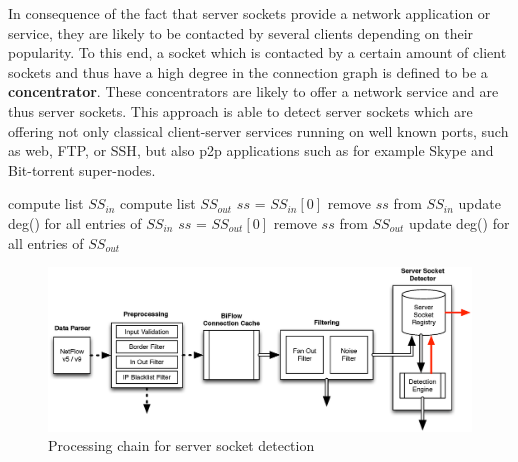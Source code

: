 In consequence of the fact that \glspl{server socket} provide a network 
application or service, they are likely to be contacted by several clients 
depending on their popularity. To this end, a socket which is contacted by a 
certain amount of client sockets and thus have a high degree in the connection 
graph is defined to be a \textbf{concentrator}. These concentrators are likely 
to offer a network service and are thus \glspl{server socket}. 
This approach is able to detect \glspl{server socket} which are offering not 
only classical client-server services running on well known ports, such as web, 
\gls{FTP}, or \gls{SSH}, but also \gls{p2p} applications such as for example 
Skype and Bit-torrent super-nodes.


\begin{algorithm}[t!]
\caption{Detection of server sockets by \citet{Schatzmann:Mining,Schatzmann:Dissection, Schatzmann:Tracing}}
\label{alg:service_tracing_ss-detection}
\begin{algorithmic}
\STATE
\STATE compute list $SS_{in}$ 
\STATE compute list $SS_{out}$ 
\STATE
{}
        \STATE $ss$ = $SS_{in}[0]$ 
        \STATE remove $ss$ from $SS_{in}$
        \STATE update deg() for all entries of $SS_{in}$
    \ENDWHILE
        \STATE $ss$ = $SS_{out}[0]$ 
        \STATE remove $ss$ from $SS_{out}$
        \STATE update deg() for all entries of $SS_{out}$
    \ENDWHILE
\ENDWHILE
\end{algorithmic}
\end{algorithm}

\begin{figure}
	[ht] \centering
	\includegraphics[width=\linewidth]{images/Detection_chain.eps}
	\caption{Processing chain for server socket detection} 
	\label{fig:detection_chain} 
\end{figure}

